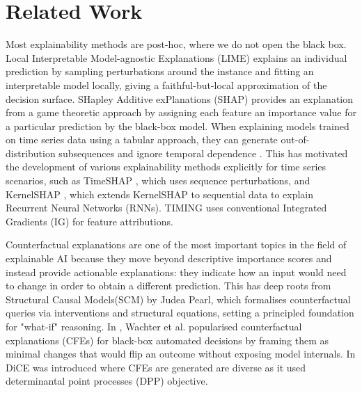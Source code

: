 \documentclass[runningheads]{llncs}
\begin{document}
	\section{Related Work}
	
	Most explainability methods are post-hoc, where we do not open the black box. Local Interpretable Model-agnostic Explanations (LIME) \cite{LIME_10.1145/2939672.2939778} explains an individual prediction by sampling perturbations around the instance and fitting an interpretable model locally, giving a faithful-but-local approximation of the decision surface. SHapley Additive exPlanations (SHAP) \cite{SHAP_10.5555/3295222.3295230} provides an explanation from a game theoretic approach by assigning each feature an importance value for a particular prediction by the black-box model. When explaining models trained on time series data using a tabular approach, they can generate out-of-distribution subsequences and ignore temporal dependence \cite{hase2021out}. This has motivated the development of various explainability methods explicitly for time series scenarios, such as TimeSHAP \cite{bento2021timeshap}, which uses sequence perturbations, and KernelSHAP \cite{SHAP_10.5555/3295222.3295230}, which extends KernelSHAP to sequential data to explain Recurrent Neural Networks (RNNs). TIMING \cite{jang2025timing} uses conventional Integrated Gradients (IG) \cite{Integrated_Grad_10.5555/3305890.3306024} for feature attributions. 
	
	Counterfactual explanations are one of the most important topics in the field of explainable AI because they move beyond descriptive importance scores and instead provide actionable explanations: they indicate how an input would need to change in order to obtain a different prediction. This has deep roots from Structural Causal Models(SCM) by Judea Pearl, which formalises counterfactual queries via interventions and structural equations, setting a principled foundation for "what-if" reasoning\cite{CF_Pearl_10.1093/logcom/exm048}. In \cite{wachter2017counterfactual}, Wachter et al. popularised counterfactual explanations (CFEs) for black-box automated decisions by framing them as minimal changes that would flip an outcome without exposing model internals. In \cite{DiCE_Mothilal_2020} DiCE was introduced where CFEs are generated are diverse as it used determinantal point processes (DPP) objective.
	
\end{document}

